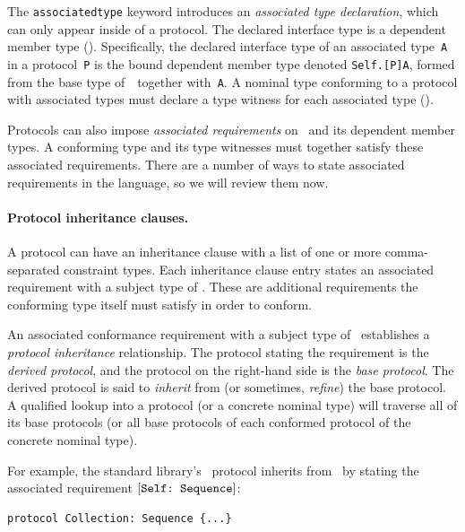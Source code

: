 \documentclass[../generics]{subfiles}
\begin{document}
The \texttt{associatedtype} keyword introduces an \emph{associated type declaration}, which can only appear inside of a protocol. The declared interface type is a dependent member type (). Specifically, the declared interface type of an associated type~\texttt{A} in a protocol~\texttt{P} is the bound dependent member type denoted \texttt{Self.[P]A}, formed from the base type of~\tSelf\ together with~\texttt{A}. A nominal type conforming to a protocol with associated types must declare a type witness for each associated type ().

Protocols can also impose \emph{associated requirements} on \tSelf\ and its dependent member types. A conforming type and its type witnesses must together satisfy these associated requirements. There are a number of ways to state associated requirements in the language, so we will review them now.

\paragraph{Protocol inheritance clauses.}
A protocol can have an inheritance clause with a list of one or more comma-separated constraint types. Each inheritance clause entry states an associated requirement with a subject type of \tSelf. These are additional requirements the conforming type itself must satisfy in order to conform.

An associated conformance requirement with a subject type of \tSelf\ establishes a \emph{protocol inheritance} relationship. The protocol stating the requirement is the \emph{derived protocol}, and the protocol on the right-hand side is the \emph{base protocol}. The derived protocol is said to \emph{inherit} from (or sometimes, \emph{refine}) the base protocol. A qualified lookup into a protocol (or a concrete nominal type) will traverse all of its base protocols (or all base protocols of each conformed protocol of the concrete nominal type).

For example, the standard library's \tCollection\ protocol inherits from \tSequence\ by stating the associated requirement $[\texttt{Self:~Sequence}]$:
\begin{Verbatim}
protocol Collection: Sequence {...}
\end{Verbatim}
\end{document}
